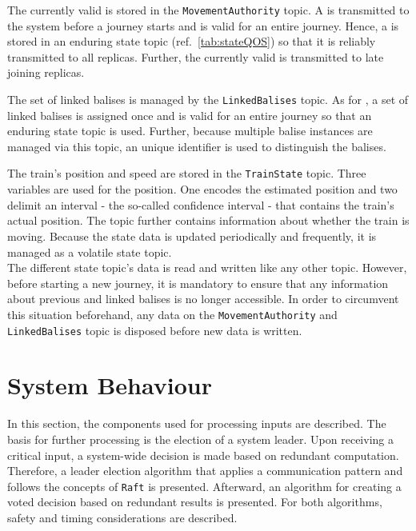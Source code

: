 The currently valid  is stored in the \texttt{MovementAuthority} topic.
A  is transmitted to the system before a journey starts and is valid for an entire journey.
Hence, a  is stored in an enduring state topic (ref.~\autoref{tab:stateQOS}) so that it is reliably transmitted to all replicas.
Further, the currently valid  is transmitted to late joining replicas.

The set of linked balises is managed by the \texttt{LinkedBalises} topic.
As for , a set of linked balises is assigned once and is valid for an entire journey so that an enduring state topic is used.
Further, because multiple balise instances are managed via this topic, an unique identifier is used to distinguish the balises.

The train's position and speed are stored in the \texttt{TrainState} topic.
Three variables are used for the position.
One encodes the estimated position and two delimit an interval - the so-called confidence interval - that contains the train's actual position.
The topic further contains information about whether the train is moving.
Because the state data is updated periodically and frequently, it is managed as a volatile  state topic.
\\

The different state topic's data is read and written like any other  topic.
However, before starting a new journey, it is mandatory to ensure that any information about previous  and linked balises is no longer accessible.
In order to circumvent this situation beforehand, any data on the \texttt{MovementAuthority} and \texttt{LinkedBalises} topic is disposed before new data is written.

\section{System Behaviour}

In this section, the components used for processing inputs are described.
The basis for further processing is the election of a system leader.
Upon receiving a critical input, a system-wide decision is made based on redundant computation.
Therefore, a leader election algorithm that applies a  communication pattern and follows the concepts of \texttt{Raft} is presented.
Afterward, an algorithm for creating a voted decision based on redundant results is presented.
For both algorithms, safety and timing considerations are described.
\\

